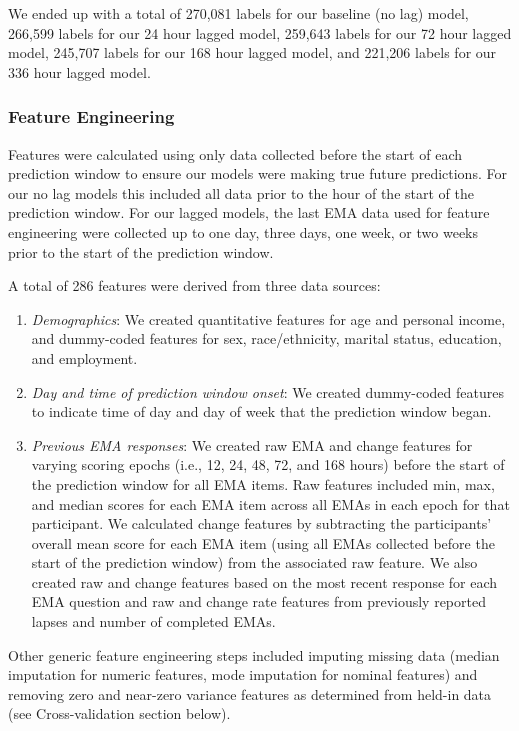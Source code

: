 \documentclass[
]{agujournal2019}
\begin{document}
We ended up with a total of 270,081 labels for our baseline (no lag)
model, 266,599 labels for our 24 hour lagged model, 259,643 labels for
our 72 hour lagged model, 245,707 labels for our 168 hour lagged model,
and 221,206 labels for our 336 hour lagged model.

\subsubsection{Feature Engineering}\label{feature-engineering}

Features were calculated using only data collected before the start of
each prediction window to ensure our models were making true future
predictions. For our no lag models this included all data prior to the
hour of the start of the prediction window. For our lagged models, the
last EMA data used for feature engineering were collected up to one day,
three days, one week, or two weeks prior to the start of the prediction
window.

A total of 286 features were derived from three data sources:

\begin{enumerate}
\def\labelenumi{\arabic{enumi}.}
\item
  \emph{Demographics}: We created quantitative features for age and
  personal income, and dummy-coded features for sex, race/ethnicity,
  marital status, education, and employment.
\item
  \emph{Day and time of prediction window onset}: We created dummy-coded
  features to indicate time of day and day of week that the prediction
  window began.
\item
  \emph{Previous EMA responses}: We created raw EMA and change features
  for varying scoring epochs (i.e., 12, 24, 48, 72, and 168 hours)
  before the start of the prediction window for all EMA items. Raw
  features included min, max, and median scores for each EMA item across
  all EMAs in each epoch for that participant. We calculated change
  features by subtracting the participants' overall mean score for each
  EMA item (using all EMAs collected before the start of the prediction
  window) from the associated raw feature. We also created raw and
  change features based on the most recent response for each EMA
  question and raw and change rate features from previously reported
  lapses and number of completed EMAs.
\end{enumerate}

Other generic feature engineering steps included imputing missing data
(median imputation for numeric features, mode imputation for nominal
features) and removing zero and near-zero variance features as
determined from held-in data (see Cross-validation section below).
\end{document}
